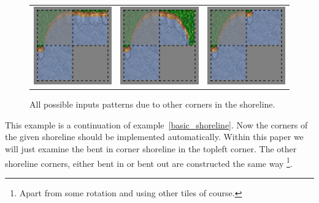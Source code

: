 \begin{figure}
\begin{center}
\begin{tabular}{c c c}
		\includegraphics[scale=1]{Example/TheManaWorld/shorelinecorners/pattern6.eps} & \includegraphics[scale=1]{Example/TheManaWorld/shorelinecorners/pattern7.eps} & \includegraphics[scale=1]{Example/TheManaWorld/shorelinecorners/pattern8.eps} \\
		\end{tabular}
  \end{center}
  \caption{All possible inputs patterns due to other corners in the shoreline.}
  \label{shoreline_corners_needed_inputs}
\end{figure}

This example is a continuation of example~\ref{basic_shoreline}.
Now the corners of the given shoreline should be implemented automatically.
Within this paper we will just examine the bent in corner shoreline in the topleft corner.
The other shoreline corners, either bent in or bent out are constructed the same way
\footnote{Apart from some rotation and using other tiles of course.}.

